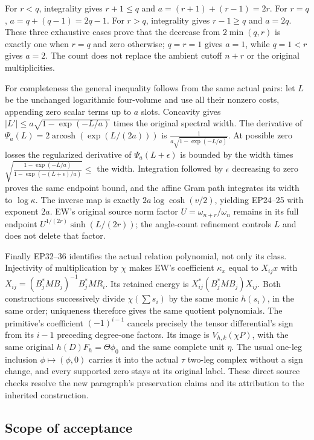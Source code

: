 For \(r<q\), integrality gives \(r+1\leq q\) and \(a=(r+1)+(r-1)=2r\).
For \(r=q\), \(a=q+(q-1)=2q-1\). For \(r>q\), integrality gives
\(r-1\geq q\) and \(a=2q\). These three exhaustive cases prove that the
decrease from \(2\min(q,r)\) is exactly one when \(r=q\) and zero
otherwise; \(q=r=1\) gives \(a=1\), while \(q=1<r\) gives \(a=2\). The
count does not replace the ambient cutoff \(n+r\) or the original
multiplicities.

For completeness the general inequality follows from the same actual
pairs: let \(L\) be the unchanged logarithmic four-volume and use all
their nonzero costs, appending zero scalar terms up to \(a\) slots.
Concavity gives \(|L'|\leq a\sqrt{1-\exp(-L/a)}\) times the original
spectral width. The derivative of
\(\Psi_a(L)=2\operatorname{arcosh}(\exp(L/(2a)))\) is
\(\frac1{a\sqrt{1-\exp(-L/a)}}\). At possible zero losses the
regularized derivative of \(\Psi_a(L+\epsilon)\) is bounded by the width
times \(\sqrt{\frac{1-\exp(-L/a)}{1-\exp(-(L+\epsilon)/a)}}\leq\) the
width. Integration followed by \(\epsilon\) decreasing to zero proves
the same endpoint bound, and the affine Gram path integrates its width
to \(\log\kappa\). The inverse map is exactly \(2a\log\cosh(v/2)\),
yielding EP24--25 with exponent \(2a\). EW's original source norm factor
\(U=\omega_{n+r}/\omega_n\) remains in its full endpoint
\(U^{1/(2r)}\sinh(L/(2r))\); the angle-count refinement controls \(L\)
and does not delete that factor.

Finally EP32--36 identifies the actual relation polynomial, not only its
class. Injectivity of multiplication by \(\chi\) makes EW's coefficient
\(\kappa_x\) equal to \(X_{ij}x\) with
\(X_{ij}=(B_j^*MB_j)^{-1}B_j^*MR_i\). Its retained energy is
\(X_{ij}^*(B_j^*MB_j)X_{ij}\). Both constructions successively divide
\(\chi\!\left(\sum s_i\right)\) by the same monic \(h(s_i)\), in the
same order; uniqueness therefore gives the same quotient polynomials.
The primitive's coefficient \((-1)^{i-1}\) cancels precisely the tensor
differential's sign from its \(i-1\) preceding degree-one factors. Its
image is \(V_{h,k}(\chi P)\), with the same original
\(h(D)F_h=\Theta\phi_0\) and the same complete unit \(\eta\). The usual
one-leg inclusion \(\phi\mapsto(\phi,0)\) carries it into the actual
\(\tau\) two-leg complex without a sign change, and every supported zero
stays at its original label. These direct source checks resolve the new
paragraph's preservation claims and its attribution to the inherited
construction.

\subsection{Scope of acceptance}\label{scope-of-acceptance}

